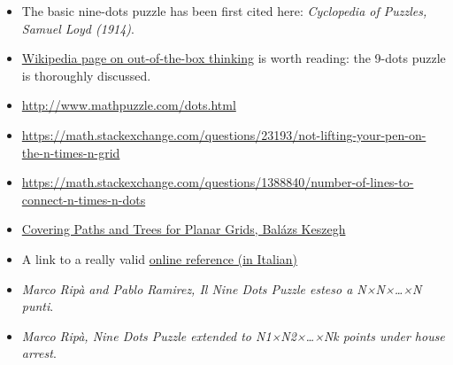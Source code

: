 \documentclass[11pt]{article}
\begin{document}
\begin{itemize}
	\item
		The basic nine-dots puzzle has been first cited here: \emph{Cyclopedia of Puzzles, Samuel Loyd (1914)}.
	\item
	\href{https://en.wikipedia.org/wiki/Thinking_outside_the_box}{Wikipedia page on out-of-the-box thinking} is worth reading: the 9-dots puzzle is thoroughly discussed.
	\item
		\href{http://www.mathpuzzle.com/dots.html}{http://www.mathpuzzle.com/dots.html}
	\item
		\href{https://math.stackexchange.com/questions/23193/not-lifting-your-pen-on-the-n-times-n-grid}{https://math.stackexchange.com/questions/23193/not-lifting-your-pen-on-the-n-times-n-grid}
	\item
		\href{https://math.stackexchange.com/questions/1388840/number-of-lines-to-connect-n-times-n-dots}{https://math.stackexchange.com/questions/1388840/number-of-lines-to-connect-n-times-n-dots}
	\item
		\href{https://arxiv.org/abs/1311.0452}{Covering Paths and Trees for Planar Grids, Balázs Keszegh}
	\item
		A link to a really valid \href{http://utenti.quipo.it/base5/geopiana/loyd9punti4linee.htm}{online reference (in Italian)}
	\item
		\emph{Marco Ripà and Pablo Ramirez, Il Nine Dots Puzzle esteso a N×N×\ldots×N punti}.
	\item
		\emph{Marco Ripà, Nine Dots Puzzle extended to N1×N2×\ldots×Nk points 	under house arrest}.
\end{itemize}
\end{document}
